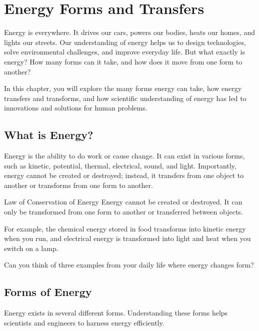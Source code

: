 \chapter{Energy Forms and Transfers}

Energy is everywhere. It drives our cars, powers our bodies, heats our homes, and lights our streets. Our understanding of energy helps us to design technologies, solve environmental challenges, and improve everyday life. But what exactly is energy? How many forms can it take, and how does it move from one form to another?

In this chapter, you will explore the many forms energy can take, how energy transfers and transforms, and how scientific understanding of energy has led to innovations and solutions for human problems.

\section{What is Energy?}

Energy is the ability to do work or cause change. It can exist in various forms, such as kinetic, potential, thermal, electrical, sound, and light. Importantly, energy cannot be created or destroyed; instead, it transfers from one object to another or transforms from one form to another.


\begin{keyconcept}{Law of Conservation of Energy}
Energy cannot be created or destroyed. It can only be transformed from one form to another or transferred between objects.
\end{keyconcept}

For example, the chemical energy stored in food transforms into kinetic energy when you run, and electrical energy is transformed into light and heat when you switch on a lamp.

\begin{stopandthink}
Can you think of three examples from your daily life where energy changes form?
\end{stopandthink}

\section{Forms of Energy}

Energy exists in several different forms. Understanding these forms helps scientists and engineers to harness energy efficiently.

